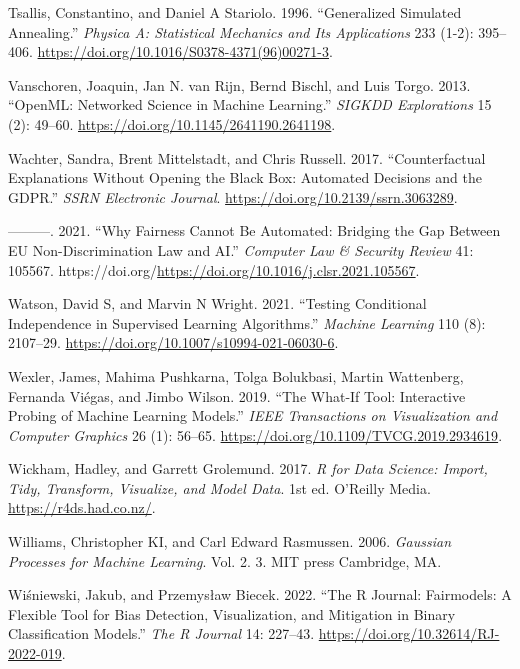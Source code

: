 \begin{CSLReferences}{1}{0}
\leavevmode{}%
Tsallis, Constantino, and Daniel A Stariolo. 1996. {``Generalized
Simulated Annealing.''} \emph{Physica A: Statistical Mechanics and Its
Applications} 233 (1-2): 395--406.
\url{https://doi.org/10.1016/S0378-4371(96)00271-3}.

\leavevmode{}%
Vanschoren, Joaquin, Jan N. van Rijn, Bernd Bischl, and Luis Torgo.
2013. {``OpenML: Networked Science in Machine Learning.''} \emph{SIGKDD
Explorations} 15 (2): 49--60.
\url{https://doi.org/10.1145/2641190.2641198}.

\leavevmode{}%
Wachter, Sandra, Brent Mittelstadt, and Chris Russell. 2017.
{``Counterfactual Explanations Without Opening the Black Box: Automated
Decisions and the {GDPR}.''} \emph{{SSRN} Electronic Journal}.
\url{https://doi.org/10.2139/ssrn.3063289}.

\leavevmode{}%
---------. 2021. {``Why Fairness Cannot Be Automated: Bridging the Gap
Between EU Non-Discrimination Law and AI.''} \emph{Computer Law \&
Security Review} 41: 105567.
https://doi.org/\url{https://doi.org/10.1016/j.clsr.2021.105567}.

\leavevmode{}%
Watson, David S, and Marvin N Wright. 2021. {``Testing Conditional
Independence in Supervised Learning Algorithms.''} \emph{Machine
Learning} 110 (8): 2107--29.
\url{https://doi.org/10.1007/s10994-021-06030-6}.

\leavevmode{}%
Wexler, James, Mahima Pushkarna, Tolga Bolukbasi, Martin Wattenberg,
Fernanda Viégas, and Jimbo Wilson. 2019. {``The What-If Tool:
Interactive Probing of Machine Learning Models.''} \emph{IEEE
Transactions on Visualization and Computer Graphics} 26 (1): 56--65.
\url{https://doi.org/10.1109/TVCG.2019.2934619}.

\leavevmode{}%
Wickham, Hadley, and Garrett Grolemund. 2017. \emph{{R} for Data
Science: Import, Tidy, Transform, Visualize, and Model Data}. 1st ed.
O'Reilly Media. \url{https://r4ds.had.co.nz/}.

\leavevmode{}%
Williams, Christopher KI, and Carl Edward Rasmussen. 2006.
\emph{Gaussian Processes for Machine Learning}. Vol. 2. 3. MIT press
Cambridge, MA.

\leavevmode{}%
Wiśniewski, Jakub, and Przemysław Biecek. 2022. {``The {R} Journal:
Fairmodels: A Flexible Tool for Bias Detection, Visualization, and
Mitigation in Binary Classification Models.''} \emph{The {R} Journal}
14: 227--43. \url{https://doi.org/10.32614/RJ-2022-019}.


\end{CSLReferences}
